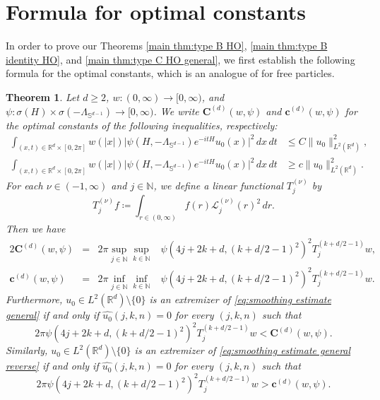 \documentclass[reqno]{amsart}
\theoremstyle{plain}
\newtheorem{theorem}{Theorem}[section]
\numberwithin{equation}{section}
\theoremstyle{remark}
\newcommand{\R}{\mathbb{R}}
\newcommand{\N}{\mathbb{N}}
\renewcommand{\S}{\mathbb{S}}
\newcommand{\intervaloo}[2]{(#1, #2)}
\newcommand{\intervalco}[2]{[#1, #2)}
\newcommand{\intervalcc}[2]{[#1, #2]}
\newcommand{\abs}[1]{\lvert#1\rvert}
\newcommand{\norm}[1]{\lVert#1\rVert}
\newcommand{\Hamiltonian}{H}
\newcommand{\LambdaS}{\Lambda_{\S^{d-1}}}
\newcommand{\Tjnu}[2]{T_{#1}^{(#2)}}
\newcommand{\Tjnuf}[3]{T_{#1}^{(#2)}#3}
\newcommand{\const}{\bm{c}}
\newcommand{\Const}{\bm{C}}
\newcommand{\hoconst}{\const}
\newcommand{\hoConst}{\Const}
\newcommand{\hoconstwpd}[3]{\hoconst^{(#3)}(#1, #2)}
\newcommand{\hoConstwpd}[3]{\hoConst^{(#3)}(#1, #2)}
\newcommand{\LaguerrecalLjnu}[2]{\mathcal{L}_{#1}^{(#2)}}
\newcommand{\fjkn}[4]{\widehat{#1}(#2, #3, #4)}
\begin{document}
\section{Formula for optimal constants} \label{section:formula}
In order to prove our Theorems \ref{main thm:type B HO}, \ref{main thm:type B identity HO}, and \ref{main thm:type C HO general}, we first establish the following formula for the optimal constants, which is an analogue of \citet[Theorem 5.4]{BS2014} for free particles.
\begin{theorem} \label{thm:optimal constant}
	Let $d \geq 2$, $w \colon \intervaloo{0}{\infty} \to \intervalco{0}{\infty}$, and $\psi \colon \sigma(\Hamiltonian) \times \sigma(-\LambdaS) \to \intervalco{0}{\infty}$.
We write $\hoConstwpd{w}{\psi}{d}$ and $\hoconstwpd{w}{\psi}{d}$ for the optimal constants of the following inequalities, respectively:
\begin{align}
	\int_{(x, t) \in \R^d \times \intervalcc{0}{2\pi}} w(\abs{x}) \abs{ \psi(\Hamiltonian, - \LambdaS) e^{- i t \Hamiltonian} u_0(x) }^2 \, dx \, dt &\leq C \norm{u_0}_{L^2(\R^d)}^2 , 
	\label{eq:smoothing estimate general} \\
	\int_{(x, t) \in \R^d \times \intervalcc{0}{2\pi}} w(\abs{x}) \abs{ \psi(\Hamiltonian, - \LambdaS) e^{- i t \Hamiltonian} u_0(x) }^2 \, dx \, dt &\geq c \norm{u_0}_{L^2(\R^d)}^2 .
	\label{eq:smoothing estimate general reverse}
\end{align}
For each $\nu \in \intervaloo{-1}{\infty}$ and $j \in \N$, we define a linear functional $\Tjnu{j}{\nu}$ by
\begin{equation}
\Tjnuf{j}{\nu}{f} \coloneqq \int_{r \in \intervaloo{0}{\infty}} f(r) \LaguerrecalLjnu{j}{\nu}(r)^2 \, dr .
\end{equation}
Then we have
\begin{alignat}{2}
	\hoConstwpd{w}{\psi}{d} &={}& 2\pi \sup_{j \in \N} \sup_{k \in \N} {}&\psi(4j+2k+d, (k+d/2-1)^2)^2 \Tjnuf{j}{k+d/2-1}{w} , 
	\label{eq:ho optimal constant C} \\
	\hoconstwpd{w}{\psi}{d} &={}&2\pi \inf_{j \in \N} \inf_{k \in \N} {}&\psi(4j+2k+d, (k+d/2-1)^2)^2 \Tjnuf{j}{k+d/2-1}{w} .
	\label{eq:ho optimal constant c}
\end{alignat}
Furthermore, $u_0 \in L^2(\R^d) \setminus \{0\}$ is an extremizer of \eqref{eq:smoothing estimate general}
if and only if 
$\fjkn{u_0}{j}{k}{n} = 0$
for every $(j, k, n)$ such that
\begin{equation}
2\pi \psi(4j+2k+d, (k+d/2-1)^2)^2 \Tjnuf{j}{k+d/2-1}{w} < \hoConstwpd{w}{\psi}{d} .
\end{equation}
Similarly, 
$u_0 \in L^2(\R^d) \setminus \{0\}$ is an extremizer of \eqref{eq:smoothing estimate general reverse}
if and only if 
$\fjkn{u_0}{j}{k}{n} = 0$
for every $(j, k, n)$ such that
\begin{equation}
2\pi \psi(4j+2k+d, (k+d/2-1)^2)^2 \Tjnuf{j}{k+d/2-1}{w} > \hoconstwpd{w}{\psi}{d} .
\end{equation}
\end{theorem}
\end{document}
